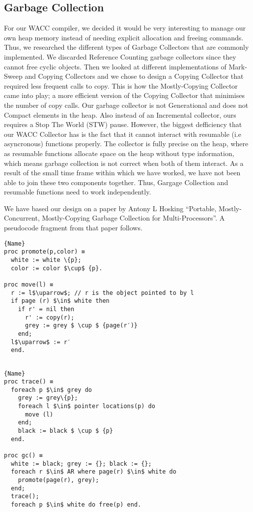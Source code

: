 \documentclass{article}
\begin{document}
\subsection{Garbage Collection}
For our WACC compiler, we decided it would be very interesting to manage our own heap memory instead of needing explicit allocation and freeing commands. Thus, we researched the different types of Garbage Collectors that
are commonly implemented. We discarded Reference Counting garbage collectors since they cannot free cyclic objects. Then we looked at different implementations of Mark-Sweep and Copying Collectors and we chose to design a Copying Collector that required less frequent calls to copy. This is how the Mostly-Copying Collector came into play; a more efficient version of the Copying Collector that minimises the number of copy calls. Our garbage collector is not Generational and does not Compact elements in the heap. Also instead of an Incremental collector, ours requires a Stop The World (STW) pause. However, the biggest defficiency that our WACC Collector has is the fact that it cannot interact with resumable (i.e asyncronous) functions properly. The collector is fully precise on the heap, where as resumable functions allocate space on the heap without type information, which means garbage collection is not correct when both of them interact. As a result of the small time frame within which we have worked, we have not been able to join these two components together. Thus, Gargage Collection and resumable functions need to work independently. 



We have based our design on a paper by Antony L Hosking ``Portable, Mostly-Concurrent, Mostly-Copying Garbage Collection for Multi-Processors''. A pseudocode fragment from that paper follows. 

\noindent\begin{minipage}{.46\textwidth}
\begin{lstlisting}[caption=code 1,frame=tlrb, mathescape]{Name}
proc promote(p,color) ≡ 
  white := white \{p}; 
  color := color $\cup$ {p}.

proc move(l) ≡ 
  r := l$\uparrow$; // r is the object pointed to by l
  if page (r) $\in$ white then 
    if r' = nil then
      r' := copy(r);
      grey := grey $ \cup $ {page(r′)}
    end;
  l$\uparrow$ := r′
  end.


\end{lstlisting}
\end{minipage}\hfill
\begin{minipage}{.45\textwidth}
\begin{lstlisting}[caption=code 2,frame=tlrb, mathescape]{Name}
proc trace() ≡ 
  foreach p $\in$ grey do
    grey := grey\{p};
    foreach l $\in$ pointer locations(p) do
      move (l)
    end;
    black := black $ \cup $ {p}
  end.

proc gc() ≡
  white := black; grey := {}; black := {}; 
  foreach r $\in$ AR where page(r) $\in$ white do
    promote(page(r), grey);
  end;
  trace();
  foreach p $\in$ white do free(p) end.
\end{lstlisting}
\end{minipage}
\end{document}
